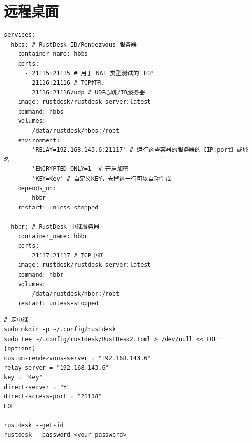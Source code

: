 \section{远程桌面}
\begin{code}[title=relay]
	\begin{verbatim}
services:
  hbbs: # RustDesk ID/Rendezvous 服务器
    container_name: hbbs
    ports:
      - 21115:21115 # 用于 NAT 类型测试的 TCP
      - 21116:21116 # TCP打孔
      - 21116:21116/udp # UDP心跳/ID服务器
    image: rustdesk/rustdesk-server:latest
    command: hbbs
    volumes:
      - /data/rustdesk/hbbs:/root
    environment:
      - 'RELAY=192.168.143.6:21117' # 运行这些容器的服务器的【IP:port】或域名
      - 'ENCRYPTED_ONLY=1' # 开启加密
      - 'KEY=Key' # 自定义KEY，去掉这一行可以自动生成
    depends_on:
      - hbbr
    restart: unless-stopped

  hbbr: # RustDesk 中继服务器
    container_name: hbbr
    ports:
      - 21117:21117 # TCP中继
    image: rustdesk/rustdesk-server:latest
    command: hbbr
    volumes:
      - /data/rustdesk/hbbr:/root
    restart: unless-stopped
    \end{verbatim}
\end{code}

\begin{code}[title=server]
	\begin{verbatim}
# 走中继
sudo mkdir -p ~/.config/rustdesk
sudo tee ~/.config/rustdesk/RustDesk2.toml > /dev/null <<'EOF'
[options]
custom-rendezvous-server = "192.168.143.6"
relay-server = "192.168.143.6"
key = "Key"
direct-server = "Y"
direct-access-port = "21118"
EOF

rustdesk --get-id
rustdesk --password <your_password>
    \end{verbatim}
\end{code}
